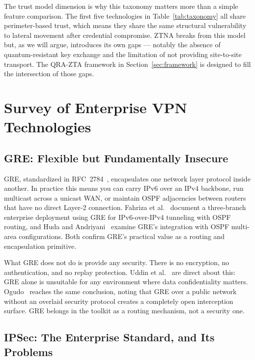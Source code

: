 \documentclass[conference]{IEEEtran}
\begin{document}
The trust model dimension is why this taxonomy matters more than
a simple feature comparison. The first five technologies in
Table~\ref{tab:taxonomy} all share perimeter-based trust, which
means they share the same structural vulnerability to lateral
movement after credential compromise. ZTNA breaks from this
model but, as we will argue, introduces its own gaps --- notably
the absence of quantum-resistant key exchange and the limitation
of not providing site-to-site transport. The QRA-ZTA framework
in Section~\ref{sec:framework} is designed to fill the
intersection of those gaps.

\section{Survey of Enterprise VPN Technologies}
\label{sec:relatedwork}

\subsection{GRE: Flexible but Fundamentally Insecure}

GRE, standardized in RFC~2784~\cite{rfc2784}, encapsulates one
network layer protocol inside another. In practice this means
you can carry IPv6 over an IPv4 backbone, run multicast across
a unicast WAN, or maintain OSPF adjacencies between routers
that have no direct Layer-2 connection. Fahriza et
al.~\cite{fahriza2026} document a three-branch enterprise
deployment using GRE for IPv6-over-IPv4 tunneling with OSPF
routing, and Huda and Andriyani~\cite{huda2025} examine GRE's
integration with OSPF multi-area configurations. Both confirm
GRE's practical value as a routing and encapsulation primitive.

What GRE does not do is provide any security. There is no
encryption, no authentication, and no replay protection. Uddin
et al.~\cite{uddin2021} are direct about this: GRE alone is
unsuitable for any environment where data confidentiality
matters. Ogudo~\cite{ogudo2019} reaches the same conclusion,
noting that GRE over a public network without an overlaid
security protocol creates a completely open interception surface.
GRE belongs in the toolkit as a routing mechanism, not a
security one.

\subsection{IPSec: The Enterprise Standard, and Its Problems}
\end{document}
